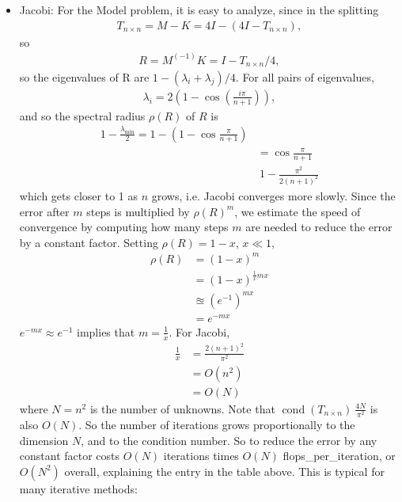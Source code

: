 \documentclass[11pt]{article}
\numberwithin{equation}{section}
\begin{document}
\begin{itemize}
    \item Jacobi: For the Model problem, it is easy to analyze, since in the splitting \begin{align*}
        T_{n\times n} = M - K = 4I - (4I - T_{n\times n}),    
    \end{align*}
    so \begin{align*}
        R = M^(-1)K = I - T_{n\times n} / 4,
    \end{align*} 
    so the eigenvalues of R are $1 - (\lambda_i+\lambda_j)/4$. For all pairs of eigenvalues, \begin{align*}
        \lambda_i = 2(1-\cos(\frac{i\pi}{n+1})),
    \end{align*}
    and so the spectral radius $\rho(R)$ of $R$ is \begin{align*}
        1 - \frac{\lambda_{\text{min}}}{2} = 1 - (1 - \cos\frac{\pi}{n+1}) \\
        &= \cos\frac{\pi}{n+1} \\
        &~ 1 - \frac{\pi^2}{2(n+1)^2}
    \end{align*}
    which gets closer to 1 as $n$ grows, i.e. Jacobi converges more slowly. Since the error after $m$ steps is multiplied by $\rho(R)^m$,
    we estimate the speed of convergence by computing how many steps $m$ are needed to reduce the error by a constant factor. 
    Setting $\rho(R) = 1 - x$, $x \ll 1$,
    \begin{align*}
        \rho(R) &= (1-x)^m \\
        &= (1-x)^{\frac{1}{x}mx} \\
        &\approxeq (e^{-1})^{mx} \\
        &= e^{-mx} 
    \end{align*}
    $e^{-m x} \approx e^{-1}$ implies that $m = \frac{1}{x}$. For Jacobi, \begin{align*}
        \frac{1}{x} &= \frac{2(n+1)^{2}}{\pi^{2}} \\
        &= O(n^2) \\
        &= O(N)
    \end{align*}
    where $N=n^2$ is the number of unknowns. Note that $\operatorname{cond}(T_{n\times n}) ~ \frac{4N}{\pi^2}$ is also $O(N)$.
    So the number of iterations grows proportionally to the dimension $N$, and to the condition number.
    So to reduce the error by any constant factor costs $O(N)$ iterations times $O(N)$ flops\_per\_iteration, or $O(N^2)$ overall, 
    explaining the entry in the table above. This is typical for many iterative methods: 

\end{itemize}
\end{document}

